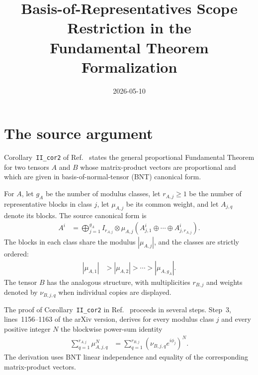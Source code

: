 \documentclass{article}
\title{Basis-of-Representatives Scope Restriction in the\\Fundamental Theorem Formalization}
\author{}
\date{2026-05-10}
\begin{document}
\maketitle
{}

\section{The source argument}

Corollary~\texttt{II\_cor2} of
Ref.~\cite{Cirac2016MPDO_arXiv} states the general proportional Fundamental
Theorem for two tensors $A$ and $B$ whose matrix-product vectors are
proportional and which are given in basis-of-normal-tensor (BNT) canonical
form.

For $A$, let $g_A$ be the number of modulus classes, let $r_{A,j}\geq1$ be the
number of representative blocks in class $j$, let $\mu_{A,j}$ be its common
weight, and let $A_{j,q}$ denote its blocks. The source canonical form is
\begin{align}
    A^i
        &= \bigoplus_{j=1}^{g_A}
            I_{r_{A,j}}\otimes
            \mu_{A,j}
            \left(A_{j,1}^i\oplus\cdots\oplus A_{j,r_{A,j}}^i\right).
    \label{eq:cpsv16_ft_one_copy_scope_restriction_source_bnt_canonical_form}
\end{align}
The blocks in each class share the modulus $|\mu_{A,j}|$, and the classes are
strictly ordered:
\begin{align}
    |\mu_{A,1}|
        &>|\mu_{A,2}|>\cdots>|\mu_{A,g_A}|.
    \label{eq:cpsv16_ft_one_copy_scope_restriction_source_strict_modulus_order}
\end{align}
The tensor $B$ has the analogous structure, with multiplicities $r_{B,j}$ and
weights denoted by $\nu_{B,j,q}$ when individual copies are displayed.

The proof of Corollary~\texttt{II\_cor2} in
Ref.~\cite{Cirac2016MPDO_arXiv} proceeds in several steps. Step~3,
lines~1156--1163 of the arXiv version, derives for every modulus class $j$ and
every positive integer $N$ the blockwise power-sum identity
\begin{align}
    \sum_{q=1}^{r_{A,j}}\mu_{A,j,q}^N
        &= \sum_{q=1}^{r_{B,j}}
            (\nu_{B,j,q}e^{i\phi_j})^N.
    \label{eq:cpsv16_ft_one_copy_scope_restriction_blockwise_power_sum_identity}
\end{align}
The derivation uses BNT linear independence and equality of the corresponding
matrix-product vectors.
\end{document}
